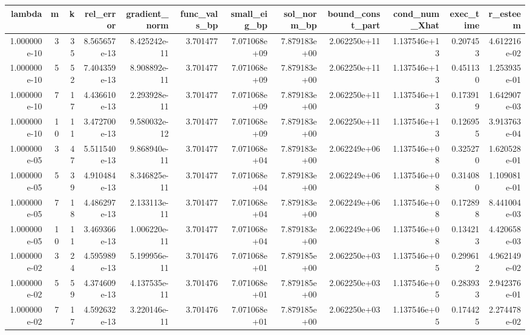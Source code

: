\begin{tabular}{rrrrrrrrrrrr}
\toprule
      lambda &  m &  k &    rel\_error &  gradient\_norm &  func\_vals\_bp &  small\_eig\_bp &  sol\_norm\_bp &  bound\_const\_part &  cond\_num\_Xhat &  exec\_time &     r\_esteem \\
\midrule
1.000000e-10 &  3 & 35 & 8.565657e-13 &   8.425242e-11 &      3.701477 &  7.071068e+09 & 7.879183e+00 &      2.062250e+11 &   1.137546e+13 &   0.207453 & 4.612216e-02 \\
1.000000e-10 &  5 & 52 & 7.404359e-13 &   8.908892e-11 &      3.701477 &  7.071068e+09 & 7.879183e+00 &      2.062250e+11 &   1.137546e+13 &   0.451130 & 1.253935e-01 \\
1.000000e-10 &  7 & 17 & 4.436610e-13 &   2.293928e-11 &      3.701477 &  7.071068e+09 & 7.879183e+00 &      2.062250e+11 &   1.137546e+13 &   0.173919 & 1.642907e-03 \\
1.000000e-10 & 10 & 11 & 3.472700e-13 &   9.580032e-12 &      3.701477 &  7.071068e+09 & 7.879183e+00 &      2.062250e+11 &   1.137546e+13 &   0.126955 & 3.913763e-04 \\
1.000000e-05 &  3 & 47 & 5.511540e-13 &   9.868940e-11 &      3.701477 &  7.071068e+04 & 7.879183e+00 &      2.062249e+06 &   1.137546e+08 &   0.325270 & 1.620528e-01 \\
1.000000e-05 &  5 & 39 & 4.910484e-13 &   8.346825e-11 &      3.701477 &  7.071068e+04 & 7.879183e+00 &      2.062249e+06 &   1.137546e+08 &   0.314080 & 1.109081e-01 \\
1.000000e-05 &  7 & 18 & 4.486297e-13 &   2.133113e-11 &      3.701477 &  7.071068e+04 & 7.879183e+00 &      2.062249e+06 &   1.137546e+08 &   0.172898 & 8.441004e-03 \\
1.000000e-05 & 10 & 11 & 3.469366e-13 &   1.006220e-11 &      3.701477 &  7.071068e+04 & 7.879183e+00 &      2.062249e+06 &   1.137546e+08 &   0.134213 & 4.420658e-03 \\
1.000000e-02 &  3 & 24 & 4.595989e-13 &   5.199956e-11 &      3.701476 &  7.071068e+01 & 7.879185e+00 &      2.062250e+03 &   1.137546e+05 &   0.299612 & 4.962149e-02 \\
1.000000e-02 &  5 & 59 & 4.374609e-13 &   4.137535e-11 &      3.701476 &  7.071068e+01 & 7.879185e+00 &      2.062250e+03 &   1.137546e+05 &   0.283933 & 2.942376e-01 \\
1.000000e-02 &  7 & 17 & 4.592632e-13 &   3.220146e-11 &      3.701476 &  7.071068e+01 & 7.879185e+00 &      2.062250e+03 &   1.137546e+05 &   0.174425 & 2.274478e-02 \\

\end{tabular}
